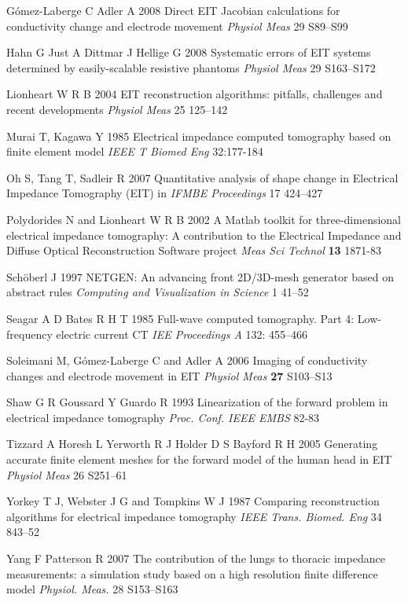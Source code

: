 \documentclass[12pt,draft]{iopart}
\begin{document}
\item[]
G\'omez-Laberge C Adler A 2008
Direct EIT Jacobian calculations for conductivity change and electrode movement
{\em Physiol Meas}
29 S89--S99


\item[]
Hahn G Just A Dittmar J  Hellige G 2008
Systematic errors of EIT systems determined by easily-scalable
 resistive phantoms
{\em Physiol Meas}
 29 S163--S172
 
\item[]
Lionheart W R B 2004
EIT reconstruction algorithms: pitfalls, challenges
and recent developments
{\em Physiol Meas}
25 125--142

\item[]
Murai T, Kagawa Y 1985
Electrical impedance computed tomography based on finite element model
{\em IEEE T Biomed Eng} 32:177-184

\item[]
Oh S, Tang T, Sadleir R 2007
Quantitative analysis of shape change in Electrical Impedance Tomography (EIT)
in {\em IFMBE Proceedings}
17 424--427

\item[]
Polydorides N and Lionheart W R B 2002 A Matlab toolkit for
three-dimensional electrical impedance tomography: A contribution
to the Electrical Impedance and Diffuse Optical Reconstruction
Software project {\em Meas Sci Technol} {\bf 13} 1871-83

\item[]
Sch\"oberl J 1997
NETGEN: An advancing front 2D/3D-mesh generator based on abstract rules
{\em Computing and Visualization in Science}
1 41--52 

\item[]
Seagar A D Bates R H T 1985
Full-wave computed tomography. Part 4: Low-frequency electric current CT
{\em IEE Proceedings A} 132: 455--466

\item[]
Soleimani M, G\'omez-Laberge C and Adler A 2006 Imaging of
conductivity changes and electrode movement in EIT
{\em Physiol Meas} {\bf 27}
S103--S13

\item[]
Shaw G R  Goussard  Y Guardo R  1993 
Linearization of the forward problem in electrical impedance tomography
{\em Proc. Conf. IEEE EMBS} 82-83

\item[]
Tizzard A Horesh L Yerworth R J Holder D S Bayford R H 2005
Generating accurate finite element meshes for the forward
model of the human head in EIT
{\em Physiol Meas}
 26 S251--61 

\item[]
Yorkey T J, Webster J G and Tompkins W J 1987
Comparing reconstruction algorithms for electrical
impedance tomography
{\em IEEE Trans. Biomed. Eng}
34 843--52

\item[]
Yang F  Patterson R 2007
The contribution of the lungs to thoracic impedance
measurements: a simulation study based on a high
resolution finite difference model
{\em Physiol. Meas.}
28 S153--S163

\endrefs
\end{document}
